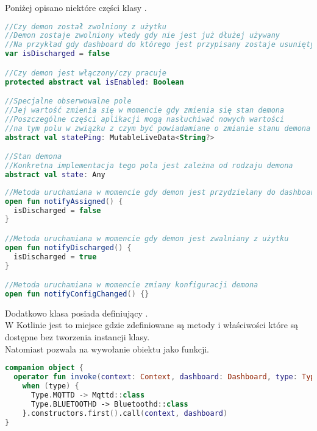 Poniżej opisano niektóre części klasy .

\begin{lstlisting}[language=Kotlin]
//Czy demon został zwolniony z użytku
//Demon zostaje zwolniony wtedy gdy nie jest już dłużej używany
//Na przykład gdy dashboard do którego jest przypisany zostaje usunięty
var isDischarged = false

//Czy demon jest włączony/czy pracuje
protected abstract val isEnabled: Boolean

//Specjalne obserwowalne pole
//Jej wartość zmienia się w momencie gdy zmienia się stan demona
//Poszczególne części aplikacji mogą nasłuchiwać nowych wartości
//na tym polu w związku z czym być powiadamiane o zmianie stanu demona
abstract val statePing: MutableLiveData<String?>

//Stan demona
//Konkretna implementacja tego pola jest zależna od rodzaju demona
abstract val state: Any
\end{lstlisting}

\newpage

\begin{lstlisting}[language=Kotlin]
//Metoda uruchamiana w momencie gdy demon jest przydzielany do dashboardu
open fun notifyAssigned() {
  isDischarged = false
}

//Metoda uruchamiana w momencie gdy demon jest zwalniany z użytku
open fun notifyDischarged() {
  isDischarged = true
}

//Metoda uruchamiana w momencie zmiany konfiguracji demona
open fun notifyConfigChanged() {}
\end{lstlisting}

\vspace{2em}

Dodatkowo klasa  posiada  definiujący .\\

W Kotlinie  jest to miejsce gdzie zdefiniowane są metody i właściwości które są dostępne bez tworzenia instancji klasy.\\
Natomiast  pozwala na wywołanie obiektu jako funkcji.\\

\begin{lstlisting}[language=Kotlin]
companion object {
  operator fun invoke(context: Context, dashboard: Dashboard, type: Type) =
    when (type) {
      Type.MQTTD -> Mqttd::class
      Type.BLUETOOTHD -> Bluetoothd::class
    }.constructors.first().call(context, dashboard)
}
\end{lstlisting}

